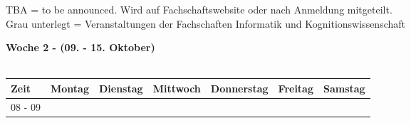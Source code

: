 {\scriptsize TBA = to be announced. Wird auf Fachschaftswebsite oder nach Anmeldung mitgeteilt.} \\
{\scriptsize Grau unterlegt = Veranstaltungen der Fachschaften Informatik und Kognitionswissenschaft }
\vfill

\pagebreak
\textbf{Woche 2 - (09. - 15. Oktober)}\\
\\
\begin{tabular}{|l|p{}|p{}|p{}|p{}|p{}|p{}|} \hline
Zeit    & Montag  & Dienstag & Mittwoch & Donnerstag    & Freitag   & Samstag   \\ \hline\hline
08 - 09 &         &          &          &               &           &           \\ \cline{1-6}

\end{tabular}
